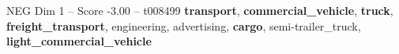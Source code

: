 \begin{textsample}{NEG Dim 1 – Score -3.00 – t008499}  \label{ex:f1_neg_027}
\textbf{transport}, \textbf{commercial\_vehicle}, \textbf{truck}, \textbf{freight\_transport}, engineering, advertising, \textbf{cargo}, semi-trailer\_truck, \textbf{light\_commercial\_vehicle}

\end{textsample}
